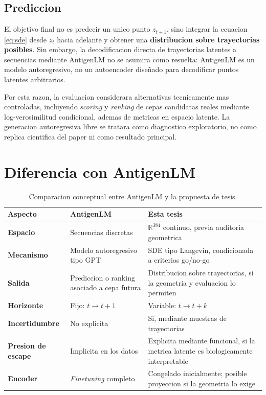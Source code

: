 \documentclass[12pt,letterpaper]{article}
\newcommand{\R}{\mathbb{R}}
\begin{document}
\subsection{Prediccion}

El objetivo final no es predecir un unico punto $z_{t+1}$, sino integrar la ecuacion \eqref{eq:sde} desde $z_t$ hacia adelante y obtener una \textbf{distribucion sobre trayectorias posibles}. Sin embargo, la decodificacion directa de trayectorias latentes a secuencias mediante AntigenLM no se asumira como resuelta: AntigenLM es un modelo autoregresivo, no un autoencoder diseñado para decodificar puntos latentes arbitrarios.

Por esta razon, la evaluacion considerara alternativas tecnicamente mas controladas, incluyendo \emph{scoring} y \emph{ranking} de cepas candidatas reales mediante log-verosimilitud condicional, ademas de metricas en espacio latente. La generacion autoregresiva libre se tratara como diagnostico exploratorio, no como replica cientifica del paper ni como resultado principal.

\section{Diferencia con AntigenLM}

\begin{table}[h!]
\centering
\renewcommand{\arraystretch}{1.2}
\begin{tabularx}{\textwidth}{>{\bfseries}p{3.2cm}XX}
\toprule
Aspecto & AntigenLM & Esta tesis \\
\midrule
Espacio & Secuencias discretas & $\R^{384}$ continuo, previa auditoria geometrica \\
Mecanismo & Modelo autoregresivo tipo GPT & SDE tipo Langevin, condicionada a criterios go/no-go \\
Salida & Prediccion o ranking asociado a cepa futura & Distribucion sobre trayectorias, si la geometria y evaluacion lo permiten \\
Horizonte & Fijo: $t \to t+1$ & Variable: $t \to t+k$ \\
Incertidumbre & No explicita & Si, mediante muestras de trayectorias \\
Presion de escape & Implicita en los datos & Explicita mediante funcional, si la metrica latente es biologicamente interpretable \\
Encoder & \emph{Finetuning} completo & Congelado inicialmente; posible proyeccion si la geometria lo exige \\
\bottomrule
\end{tabularx}
\caption{Comparacion conceptual entre AntigenLM y la propuesta de tesis.}
\label{tab:comparacion-antigenlm}
\end{table}
\end{document}
